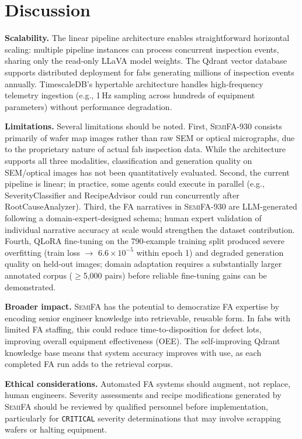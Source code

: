 \documentclass[conference]{IEEEtran}
\newcommand{\semifa}{\textsc{SemiFA}}
\newcommand{\semidataset}{\textsc{SemiFA-930}}
\begin{document}
\section{Discussion}
\label{sec:discussion}

\textbf{Scalability.}
The linear pipeline architecture enables straightforward horizontal scaling: multiple pipeline instances can process concurrent inspection events, sharing only the read-only LLaVA model weights.
The Qdrant vector database supports distributed deployment for fabs generating millions of inspection events annually.
TimescaleDB's hypertable architecture handles high-frequency telemetry ingestion (e.g., 1\,Hz sampling across hundreds of equipment parameters) without performance degradation.

\textbf{Limitations.}
Several limitations should be noted.
First, \semidataset{} consists primarily of wafer map images rather than raw SEM or optical micrographs, due to the proprietary nature of actual fab inspection data.
While the architecture supports all three modalities, classification and generation quality on SEM/optical images has not been quantitatively evaluated.
Second, the current pipeline is linear; in practice, some agents could execute in parallel (e.g., SeverityClassifier and RecipeAdvisor could run concurrently after RootCauseAnalyzer).
Third, the FA narratives in \semidataset{} are LLM-generated following a domain-expert-designed schema; human expert validation of individual narrative accuracy at scale would strengthen the dataset contribution.
Fourth, QLoRA fine-tuning on the 790-example training split produced severe overfitting (train loss $\rightarrow$ $6.6 \times 10^{-5}$ within epoch 1) and degraded generation quality on held-out images; domain adaptation requires a substantially larger annotated corpus ($\geq$5{,}000 pairs) before reliable fine-tuning gains can be demonstrated.

\textbf{Broader impact.}
\semifa{} has the potential to democratize FA expertise by encoding senior engineer knowledge into retrievable, reusable form.
In fabs with limited FA staffing, this could reduce time-to-disposition for defect lots, improving overall equipment effectiveness (OEE).
The self-improving Qdrant knowledge base means that system accuracy improves with use, as each completed FA run adds to the retrieval corpus.

\textbf{Ethical considerations.}
Automated FA systems should augment, not replace, human engineers.
Severity assessments and recipe modifications generated by \semifa{} should be reviewed by qualified personnel before implementation, particularly for \texttt{CRITICAL} severity determinations that may involve scrapping wafers or halting equipment.
\end{document}
